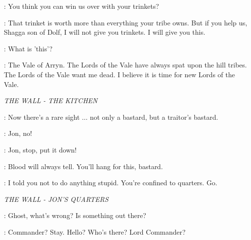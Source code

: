 
\SHAGGA: You think you can win us over with your trinkets? 


\TYRION: That trinket is worth more than everything your tribe owns. But if you help us, Shagga son of Dolf, I will not give you trinkets. I will give you this. 

\SHAGGA: What is 'this'? 

\TYRION: The Vale of Arryn. The Lords of the Vale have always spat upon the hill tribes. The Lords of the Vale want me dead. I believe it is time for new Lords of the Vale. 


\scene

\textit{THE WALL - THE KITCHEN} 


\ALLISER: Now there's a rare sight $\ldots$ not only a bastard, but a traitor's bastard. 


\SAM: Jon, no! 

\PYP: Jon, stop, put it down! 

\ALLISER: Blood will always tell. You'll hang for this, bastard. 


\JEOR: I told you not to do anything stupid. You're confined to quarters. Go. 


\scene

\textit{THE WALL - JON'S QUARTERS} 


\JON: Ghost, what's wrong?  Is something out there? 


\JON: Commander?  Stay.  Hello? Who's there? Lord Commander? 


